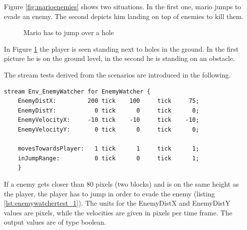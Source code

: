 Figure \ref{fig:marioenemies} shows two situations. In the first one, mario jumps to evade an enemy. The second depicts him landing on top of enemies to kill them.

\begin{figure} 
	\centering
	\caption{Mario has to jump over a hole} 
	\label{fig:mariohole}
\end{figure} 
In Figure \ref{fig:mariohole} the player is seen standing next to holes in the ground. In the first picture he is on the ground level, in the second he is standing on an obstacle.

The stream tests derived from the scenarios are introduced in the following.
\begin{lstlisting}[label=lst:enemywatchertest_1, caption=Enemy watcher stream test, morekeywords={},
frame=single, basicstyle=\tiny]
stream Env_EnemyWatcher for EnemyWatcher {
    EnemyDistX:         200 tick    100     tick     75;
    EnemyDistY:           0 tick      0     tick      0;
    EnemyVelocityX:     -10 tick    -10     tick    -10;
    EnemyVelocityY:       0 tick      0     tick      0;
            
    movesTowardsPlayer:   1 tick      1     tick      1;
    inJumpRange:          0 tick      0     tick      1;
    }
\end{lstlisting}
If a enemy gets closer than 80 pixels (two blocks) and is on the same height as the player, the player has to jump in order to evade the enemy (listing \ref{lst:enemywatchertest_1}). The units for the EnemyDistX and EnemyDistY values are pixels, while the velocities are given in pixels per time frame.
The output values are of type boolean.


